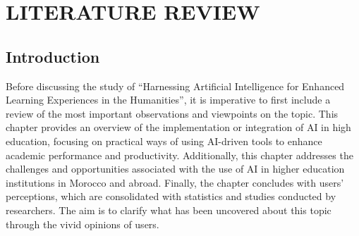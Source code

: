 \chapter{LITERATURE REVIEW}\label{ch:literature-review}
\section{Introduction}
\justifying
Before discussing the study of  ``Harnessing Artificial Intelligence for Enhanced 
Learning Experiences in the Humanities'', it is imperative to first include a review of the most
important observations and viewpoints on the topic. This chapter provides an overview of 
the implementation or integration of AI in high education, focusing on practical ways of using AI-driven tools
to enhance academic performance and productivity. Additionally,
this chapter addresses the challenges and opportunities associated with the use of AI in higher education
institutions in Morocco and abroad. 
Finally, the chapter concludes with users' perceptions, which are consolidated with
statistics and studies conducted by researchers. The aim is to clarify 
what has been uncovered about this topic through the vivid opinions of users.
